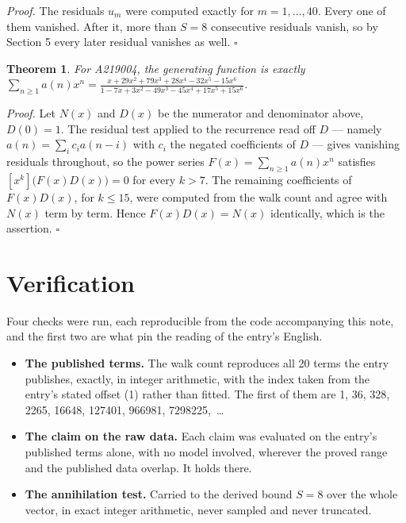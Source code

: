 \documentclass[11pt]{article}
\newtheorem{theorem}{Theorem}
\theoremstyle{definition}
\begin{document}
{\itshape Proof.} The residuals $u_m$ were computed exactly for $m = 1,\dots,40$. Every one of them vanished. After it, more than $S = 8$ consecutive residuals vanish, so by Section 5 every later residual vanishes as well. $\square$

\begin{theorem} For A219004, the generating function is exactly $\sum_{n\ge 1} a(n)x^n = \frac{x + 29x^{2} + 79x^{3} + 28x^{4} - 32x^{5} - 15x^{6}}{1 - 7x + 3x^{2} - 49x^{3} - 45x^{4} + 17x^{5} + 15x^{6}}$.\end{theorem}

{\itshape Proof.} Let $N(x)$ and $D(x)$ be the numerator and denominator above, $D(0)=1$. The residual test applied to the recurrence read off $D$ --- namely $a(n) = \sum_i c_i a(n-i)$ with $c_i$ the negated coefficients of $D$ --- gives vanishing residuals throughout, so the power series $F(x)=\sum_{n\ge 1}a(n)x^n$ satisfies $[x^k]\bigl(F(x)D(x)\bigr) = 0$ for every $k > 7$. The remaining coefficients of $F(x)D(x)$, for $k \le 15$, were computed from the walk count and agree with $N(x)$ term by term. Hence $F(x)D(x) = N(x)$ identically, which is the assertion. $\square$

\section{Verification}

Four checks were run, each reproducible from the code accompanying this note, and the first two are what pin the reading of the entry's English.

\begin{itemize}

\item {\bfseries The published terms.} The walk count reproduces all 20 terms the entry publishes, exactly, in integer arithmetic, with the index taken from the entry's stated offset (1) rather than fitted. The first of them are 1, 36, 328, 2265, 16648, 127401, 966981, 7298225,~\dots

\item {\bfseries The claim on the raw data.} Each claim was evaluated on the entry's published terms alone, with no model involved, wherever the proved range and the published data overlap. It holds there.

\item {\bfseries The annihilation test.} Carried to the derived bound $S = 8$ over the whole vector, in exact integer arithmetic, never sampled and never truncated.

\end{itemize}
\end{document}
